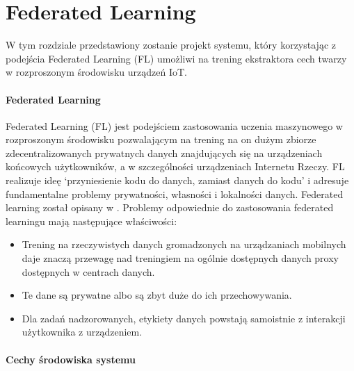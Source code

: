 \newpage
\section[federated]{Federated Learning}\label{sec:federated}

W tym rozdziale przedstawiony zostanie projekt systemu, który korzystając z podejścia Federated  Learning (FL) umożliwi na trening ekstraktora cech twarzy w rozproszonym środowisku urządzeń IoT.


\paragraph{Federated Learning}

Federated Learning (FL) jest podejściem zastosowania uczenia maszynowego w rozproszonym
środowisku pozwalającym na trening na on dużym zbiorze zdecentralizowanych prywatnych
danych znajdujących się na urządzeniach końcowych użytkowników, a w szczególności urządzeniach
Internetu Rzeczy. FL realizuje ideę `przyniesienie kodu do danych, zamiast danych do kodu' i
adresuje fundamentalne problemy prywatności, własności i lokalności danych. Federated learning
został opisany w \cite{FLBasic,FLSystemDesign,FLOptimization,FLSecureAggregation}.
Problemy odpowiednie do zastosowania federated learningu mają następujące właściwości:
\begin{itemize}
  \item Trening na rzeczywistych danych gromadzonych na urządzaniach mobilnych daje znaczą przewagę
  nad treningiem na ogólnie dostępnych danych proxy dostępnych w centrach danych.
  \item Te dane są prywatne albo są zbyt duże do ich przechowywania.
  \item Dla zadań nadzorowanych, etykiety danych powstają samoistnie z interakcji użytkownika z urządzeniem.
\end{itemize}

\paragraph{Cechy środowiska systemu}

